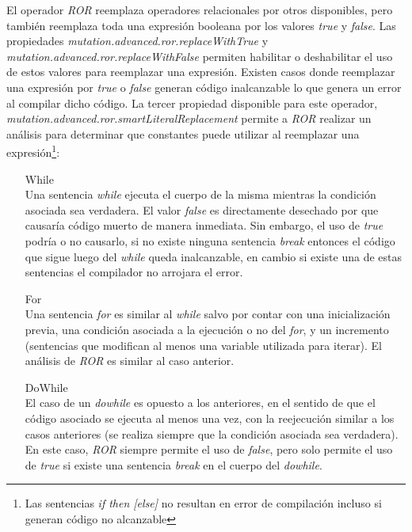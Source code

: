 El operador \emph{ROR} reemplaza operadores relacionales por otros disponibles, pero tambi\'en reemplaza toda una expresi\'on booleana por los valores \emph{true} y \emph{false}. Las propiedades \emph{mutation.advanced.ror.replaceWithTrue} y \emph{mutation.advanced.ror.replaceWithFalse} permiten habilitar o deshabilitar el uso de estos valores para reemplazar una expresi\'on. Existen casos donde reemplazar una expresi\'on por \emph{true} o \emph{false} generan c\'odigo inalcanzable lo que genera un error al compilar dicho c\'odigo. La tercer propiedad disponible para este operador, \emph{mutation.advanced.ror.smartLiteralReplacement} permite a \emph{ROR} realizar un an\'alisis para determinar que constantes puede utilizar al reemplazar una expresi\'on\footnote{Las sentencias \emph{if then [else]} no resultan en error de compilaci\'on incluso si generan c\'odigo no alcanzable}:
\begin{enumerate}[leftmargin=.75cm,align=left,style=nextline]
	\item[While]\mbox{}\\ Una sentencia \emph{while} ejecuta el cuerpo de la misma mientras la condici\'on asociada sea verdadera. El valor \emph{false} es directamente desechado por que causar\'ia c\'odigo muerto de manera inmediata. Sin embargo, el uso de \emph{true} podr\'ia o no causarlo, si no existe ninguna sentencia \emph{break} entonces el c\'odigo que sigue luego del \emph{while} queda inalcanzable, en cambio si existe una de estas sentencias el compilador no arrojara el error.
	
	\item[For]\mbox{}\\ Una sentencia \emph{for} es similar al \emph{while} salvo por contar con una inicializaci\'on previa, una condici\'on asociada a la ejecuci\'on o no del \emph{for}, y un incremento (sentencias que modifican al menos una variable utilizada para iterar). El an\'alisis de \emph{ROR} es similar al caso anterior.
	
	\item[DoWhile]\mbox{}\\ El caso de un \emph{dowhile} es opuesto a los anteriores, en el sentido de que el c\'odigo asociado se ejecuta al menos una vez, con la reejecuci\'on similar a los casos anteriores (se realiza siempre que la condici\'on asociada sea verdadera). En este caso, \emph{ROR} siempre permite el uso de \emph{false}, pero solo permite el uso de \emph{true} si existe una sentencia \emph{break} en el cuerpo del \emph{dowhile}.
\end{enumerate}

